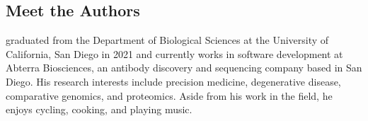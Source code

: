 \documentclass{article}
\renewcommand{\sc}[1]{\text{\scshape #1}}
\begin{document}
\subsection*{Meet the Authors}
\hline\vspace{5}
\noindent\begin{minipage}{0.2\textwidth}
{%
\setlength{\fboxsep}{0pt}%
\setlength{\fboxrule}{1pt}%
%
}%
\end{minipage}%
\hfill%
\begin{minipage}{0.75\textwidth}
\sc{Parker Côté} graduated from the Department of Biological Sciences at the University of California, San Diego in 2021 and currently works in software development at Abterra Biosciences, an antibody discovery and sequencing company based in San Diego. His research interests include precision medicine, degenerative disease, comparative genomics, and proteomics. Aside from his work in the field, he enjoys cycling, cooking, and playing music.
\end{minipage}

\vspace{32}
\end{document}
